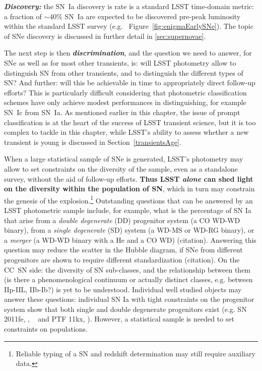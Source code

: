 {\bf \emph{Discovery:}} the SN~Ia discovery is rate is a standard LSST time-domain metric: a
fraction of $\sim40\%$ SN~Ia are expected to be discovered pre-peak
luminosity within the standard LSST survey
(e.g. ~Figure~\ref{fig:enigmaEarlySNe}). The
topic of SNe discovery is discussed in further detail in
\ref{sec:supernovae}.

The next step is then {\bf\emph{discrimination}}, and the question we need
to answer, for SNe as well as for most other transients, is: will LSST
photometry allow to distinguish SN from other transients, and to
distinguish the different types of SN? And further: will this be
achievable in time to appropriately direct follow-up efforts? This is
particularly difficult considering that photometric classification
schemes have only achieve modest performances in distinguishing, for
example SN~Ic from SN~Ia. As mentioned earlier in this chapter, the issue
of prompt classification is at the heart of the success of LSST
transient science, but it is too complex to tackle in this chapter,
while LSST's ability to assess whether a new transient is young is discussed
in Section~\ref{transientsAge}.

When a large statistical sample of SNe is generated, LSST's photometry
may allow to set constraints on the diversity of the sample, even as a
standalone survey, without the aid of follow-up efforts.
{\bf Thus LSST \emph{alone} can shed light on the diversity within the population of SN},
which in turn may constrain the genesis of the explosion.\footnote{Reliable typing of a SN and redshift determination may still require auxiliary data.} Outstanding
questions that can be answered by an LSST photometric sample include,
for example, what is the percentage of SN Ia that arise from a
\emph{double degenerate} (DD) progenitor system (a CO WD-WD binary), from a
\emph {single degenerate} (SD) system (a WD-MS or WD-RG binary), or a
\emph{merger} (a WD-WD binary with a He and a CO WD)
(citation). Answering this question may reduce the scatter in the
Hubble diagram, if SNe from different progenitors are shown to require
different standardization (citation). On the CC~SN side: the diversity
of SN sub-classes, and the relationship between them (is there a
phenomenological continuum or actually distinct classes, e.g. between
IIp-IIL, IIb-Ib?) is yet to be understood. Individual well studied
objects may answer these questions: individual SN Ia with tight
constraints on the progenitor system show that both single and double
degenerate progenitors exist (e.g. SN 2011fe, \citealt{Li11}, ~\citealt{Olling15} and
PTF 11kx, \citealt{Dilday12}). However, a statistical sample is needed
to set constraints on populations.

